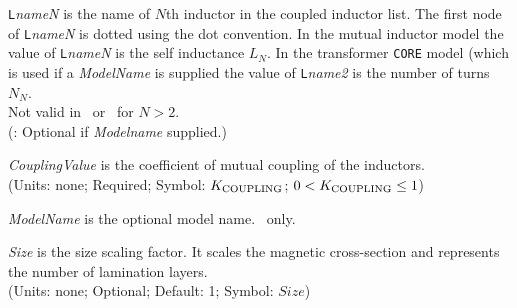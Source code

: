 \begin{widelist}
\item[{\tt L}{\it nameN}] is the name of $N$th inductor in the
coupled inductor list. The first node of {\tt L}{\it nameN} is
dotted using the dot convention.
In the mutual inductor model the value of
{\tt L}{\it nameN} is the self inductance $L_N$.
In the transformer {\tt CORE} model (which is used if a {\it ModelName}
is supplied
the value of {\tt L}{\it name2} is the number of turns $N_N$.\\
Not valid in \spicetwo\ or \spicethree\ for $N > 2$.\\
(\pspice :
Optional if {\it Modelname} supplied.)

\item[{\it CouplingValue}]  is  the  coefficient of mutual coupling of
the inductors.\\
(Units: none; Required; Symbol: $K_{\mbox{\scriptsize COUPLING}}$;
$ 0 < K_{\mbox{\scriptsize COUPLING}} \le 1$)

\item[{\it ModelName}]  is  the optional  model name.
\pspice\ only.

\item[{\it Size}]  is the size scaling factor. It scales the magnetic
cross-section and represents the number of lamination layers.\\
               (Units: none; Optional; Default: 1; Symbol: $Size$)
\end{widelist}





